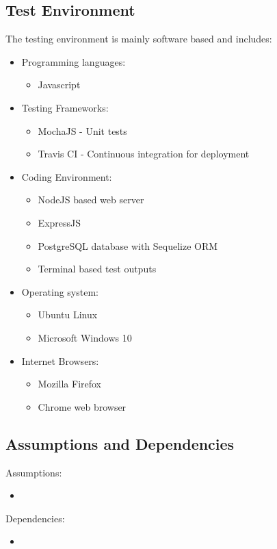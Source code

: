 \documentclass{article}
\begin{document}
\subsection{Test Environment}\label{subsec:testEnvironment}
The testing environment is mainly software based and includes:
\begin{itemize}
	\item Programming languages:
	\begin{itemize}
		\item Javascript 
	\end{itemize}
	\item Testing Frameworks:
	\begin{itemize}
		\item MochaJS - Unit tests
		\item Travis CI - Continuous integration for deployment
	\end{itemize}
	\item Coding Environment:
	\begin{itemize}
		\item NodeJS based web server
		\item ExpressJS
		\item PostgreSQL database with Sequelize ORM
		\item Terminal based test outputs
	\end{itemize}
	\item Operating system:
	\begin{itemize}
		\item Ubuntu Linux
		\item Microsoft Windows 10
	\end{itemize}
	\item Internet Browsers:
	\begin{itemize}
		\item Mozilla Firefox
		\item Chrome web browser
	\end{itemize}
\end{itemize}

\subsection{Assumptions and Dependencies}\label{subsec:assumptions}
Assumptions:
\begin{itemize}
	\item 
\end{itemize}
Dependencies:
\begin{itemize}
	\item
\end{itemize}
\end{document}
